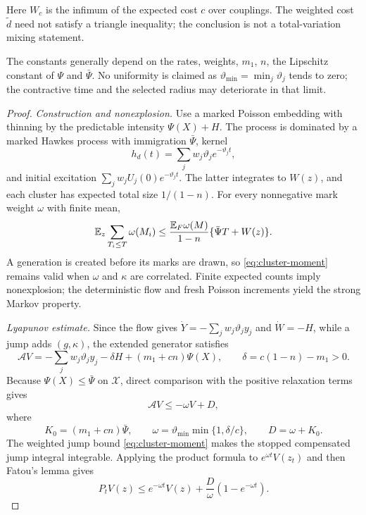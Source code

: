 Here \(W_c\) is the infimum of the expected cost \(c\) over couplings. The weighted cost \(\widetilde d\) need not satisfy a triangle inequality; the conclusion is not a total-variation mixing statement.

The constants generally depend on the rates, weights, \(m_1\), \(n\), the Lipschitz constant of \(\Psi\) and \(\bar\Psi\). No uniformity is claimed as \(\vartheta_{\min}=\min_j\vartheta_j\) tends to zero; the contractive time and the selected radius may deteriorate in that limit.

\begin{proof}
\emph{Construction and nonexplosion.} Use a marked Poisson embedding with thinning by the predictable intensity \(\Psi(X)+H\). The process is dominated by a marked Hawkes process with immigration \(\bar\Psi\), kernel
\[
h_d(t)=\sum_jw_j\vartheta_je^{-\vartheta_jt},
\]
and initial excitation \(\sum_jw_jU_j(0)e^{-\vartheta_jt}\). The latter integrates to \(W(z)\), and each cluster has expected total size \(1/(1-n)\). For every nonnegative mark weight \(\omega\) with finite mean,
\begin{equation}\label{eq:cluster-moment}
\mathbb{E} _z\sum_{T_i\leq T}\omega(M_i)
\leq\frac{\mathbb{E} _F\omega(M)}{1-n}
\{\bar\Psi T+W(z)\}.
\end{equation}
A generation is created before its marks are drawn, so \eqref{eq:cluster-moment} remains valid when \(\omega\) and \(\kappa\) are correlated. Finite expected counts imply nonexplosion; the deterministic flow and fresh Poisson increments yield the strong Markov property.

\emph{Lyapunov estimate.} Since the flow gives \(\dot Y=-\sum_jw_j\vartheta_jy_j\) and \(\dot W=-H\), while a jump adds \((g,\kappa)\), the extended generator satisfies
\[
\mathcal AV
=-\sum_jw_j\vartheta_jy_j-\delta H+(m_1+cn)\Psi(X),
\qquad
\delta=c(1-n)-m_1>0.
\]
Because \(\Psi(X)\leq\bar\Psi\) on \(\mathcal X\), direct comparison with the positive relaxation terms gives
\begin{equation}\label{eq:generator-bound}
\mathcal AV\leq-\omega V+D,
\end{equation}
where
\[
K_0=(m_1+cn)\bar\Psi,\qquad
\omega=\vartheta_{\min}\min\{1,\delta/c\},\qquad
D=\omega+K_0.
\]
The weighted jump bound \eqref{eq:cluster-moment} makes the stopped compensated jump integral integrable. Applying the product formula to \(e^{\omega t}V(z_t)\) and then Fatou's lemma gives
\begin{equation}\label{eq:lyap-moment}
P_tV(z)\leq e^{-\omega t}V(z)+\frac{D}{\omega}(1-e^{-\omega t}).
\end{equation}


\end{proof}
